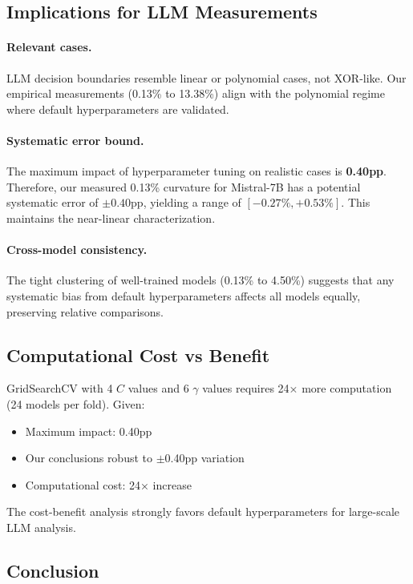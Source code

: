 \documentclass[11pt]{article}
\begin{document}
\subsection{Implications for LLM Measurements}

\paragraph{Relevant cases.}
LLM decision boundaries resemble linear or polynomial cases, not XOR-like. Our empirical measurements (0.13\% to 13.38\%) align with the polynomial regime where default hyperparameters are validated.

\paragraph{Systematic error bound.}
The maximum impact of hyperparameter tuning on realistic cases is \textbf{0.40pp}. Therefore, our measured 0.13\% curvature for Mistral-7B has a potential systematic error of $\pm 0.40$pp, yielding a range of $[-0.27\%, +0.53\%]$. This maintains the near-linear characterization.

\paragraph{Cross-model consistency.}
The tight clustering of well-trained models (0.13\% to 4.50\%) suggests that any systematic bias from default hyperparameters affects all models equally, preserving relative comparisons.

\subsection{Computational Cost vs Benefit}

GridSearchCV with 4 $C$ values and 6 $\gamma$ values requires 24× more computation (24 models per fold). Given:
\begin{itemize}
    \item Maximum impact: 0.40pp
    \item Our conclusions robust to $\pm$0.40pp variation
    \item Computational cost: 24× increase
\end{itemize}

The cost-benefit analysis strongly favors default hyperparameters for large-scale LLM analysis.

\subsection{Conclusion}
\end{document}
